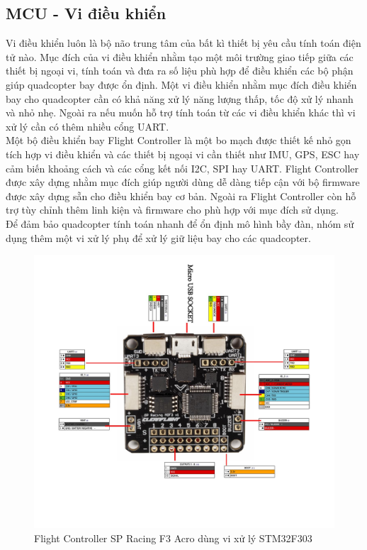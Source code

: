     \subsection{MCU - Vi điều khiển}
    Vi điều khiển luôn là bộ não trung tâm của bất kì thiết bị yêu cầu tính toán điện tử nào. Mục đích của vi điều khiển nhằm tạo một môi trường giao tiếp giữa các thiết bị ngoại vi, tính toán và đưa ra số liệu phù hợp để điều khiển các bộ phận giúp quadcopter bay được ổn định. Một vi điều khiển nhằm mục đích điều khiển bay cho quadcopter cần có khả năng xử lý năng lượng thấp, tốc độ xử lý nhanh và nhỏ nhẹ. Ngoài ra nếu muốn hỗ trợ tính toán từ các vi điều khiển khác thì vi xử lý cần có thêm nhiều cổng UART. \\
    Một bộ điều khiển bay Flight Controller là một bo mạch được thiết kế nhỏ gọn tích hợp vi điều khiển và các thiết bị ngoại vi cần thiết như IMU, GPS, ESC hay cảm biến khoảng cách và các cổng kết nối I2C, SPI hay UART. Flight Controller được xây dựng nhằm mục đích giúp người dùng dễ dàng tiếp cận với bộ firmware được xây dựng sẵn cho điều khiển bay cơ bản. Ngoài ra Flight Controller còn hỗ trợ tùy chỉnh thêm linh kiện và firmware cho phù hợp với mục đích sử dụng. \\
    Để đảm bảo quadcopter tính toán nhanh để ổn định mô hình bầy đàn, nhóm sử dụng thêm một vi xử lý phụ để xử lý giữ liệu bay cho các quadcopter.
    
    \begin{figure}[h!]
    	\begin{center}
    		\includegraphics[scale=1.1]{images/sp_racing_f3.jpg}
    		\caption{Flight Controller SP Racing F3 Acro dùng vi xử lý STM32F303}
    	\end{center}
    \end{figure}
    
